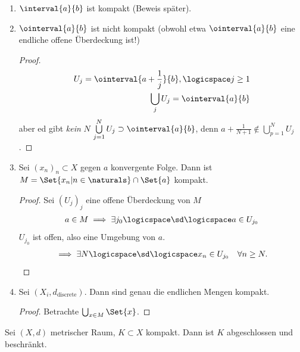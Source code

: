 \begin{beispiele}
    \begin{enumerate}
        \item \( \interval{a}{b} \) ist kompakt (Beweis später).
        \item \( \ointerval{a}{b} \) ist nicht kompakt (obwohl etwa \( \ointerval{a}{b} \) eine endliche offene Überdeckung ist!)
        \begin{proof}
            \begin{align*}
                U_j=\ointerval{a+\frac{1}{j}}{b},\logicspace j\geq 1\\
                \bigcup_j U_j=\ointerval{a}{b} 
            \end{align*}
            aber ed gibt \emph{kein} \( N\) \sd
                \( \bigcup\limits_{j=1}^{N}U_j\supset \ointerval{a}{b} \), denn \zb \( a+\frac{1}{N+1}\notin \bigcup_{p=1}^{N}U_j \).  
        \end{proof}
        
        \item Sei \( (x_n)_n\subset X\) gegen \( a\) konvergente Folge. Dann ist \( M=\Set{x_n|n\in \naturals }\cap \Set{a}\) kompakt.
        \begin{proof}
            Sei \( (U_j)_j\) eine offene Überdeckung von \( M\)
            \begin{align*}
                a\in M\implies \exists j_0\logicspace \sd \logicspace a\in U_{j_0}
            \end{align*} 
            \( U_{j_0}\) ist offen, also eine Umgebung von \( a\).
            \begin{align*}
                \implies \exists N\logicspace \sd \logicspace  x_n\in U_{j_0}\quad \forall n\geq N.
            \end{align*}
        \end{proof}
        
        \item Sei \( (X_i,d_{\text{discrete}})\). Dann sind genau die endlichen Mengen kompakt.
        \begin{proof}
            Betrachte \( \bigcup_{x\in M} \Set{x}\). 
        \end{proof}        
    \end{enumerate}
\end{beispiele}
\begin{satz}\label{kompakt:abgeschlossen_beschraenkt}
    Sei \( (X,d)\) metrischer Raum, \( K\subset X\) kompakt. Dann ist \( K\) abgeschlossen und beschränkt. 
\end{satz}
